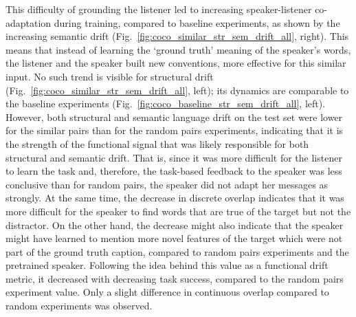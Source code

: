 This difficulty of grounding the listener led to increasing speaker-listener co-adaptation during training, compared to baseline experiments, as shown by the increasing semantic drift (Fig.~\ref{fig:coco_similar_str_sem_drift_all}, right). This means that instead of learning the `ground truth' meaning of the speaker's words, the listener and the speaker built new conventions, more effective for this similar input. No such trend is visible for structural drift (Fig.~\ref{fig:coco_similar_str_sem_drift_all}, left); its dynamics are comparable to the baseline experiments (Fig.~\ref{fig:coco_baseline_str_sem_drift_all}, left). 
However, both structural and semantic language drift on the test set were lower for the similar pairs than for the random pairs experiments, indicating that it is the strength of the functional signal that was likely responsible for both structural and semantic drift. That is, since it was more difficult for the listener to learn the task and, therefore, the task-based feedback to the speaker was less conclusive than for random pairs, the speaker did not adapt her messages as strongly.
At the same time, the decrease in discrete overlap indicates that it was more difficult for the speaker to find words that are true of the target but not the distractor. On the other hand, the decrease might also indicate that the speaker might have learned to mention more novel features of the target which were not part of the ground truth caption, compared to random pairs experiments and the pretrained speaker. Following the idea behind this value as a functional drift metric, it decreased with decreasing task success, compared to the random pairs experiment value. Only a slight difference in continuous overlap compared to random experiments was observed.

